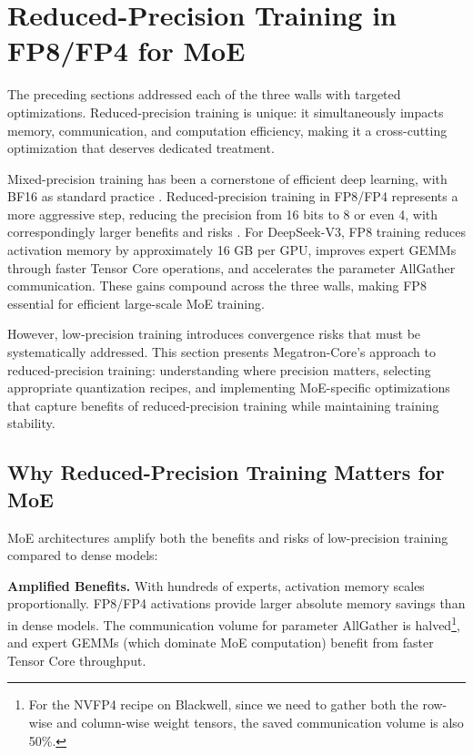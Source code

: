 
\section{Reduced-Precision Training in FP8/FP4 for MoE}\label{sec:reduced-precision-training}

The preceding sections addressed each of the three walls with targeted optimizations. Reduced-precision training is unique: it simultaneously impacts memory, communication, and computation efficiency, making it a cross-cutting optimization that deserves dedicated treatment.

Mixed-precision training has been a cornerstone of efficient deep learning, with BF16 as standard practice \cite{micikevicius2018mixed,peng2023fp8lmtrainingfp8large,xi2024coat}. Reduced-precision training in FP8/FP4 represents a more aggressive step, reducing the precision from 16 bits to 8 or even 4, with correspondingly larger benefits and risks \cite{micikevicius2022fp8formatsdeeplearning,fishman2025scalingfp8trainingtrilliontoken}. For DeepSeek-V3, FP8 training reduces activation memory by approximately 16 GB per GPU, improves expert GEMMs through faster Tensor Core operations, and accelerates the parameter AllGather communication. These gains compound across the three walls, making FP8 essential for efficient large-scale MoE training.

However, low-precision training introduces convergence risks that must be systematically addressed. This section presents Megatron-Core's approach to reduced-precision training: understanding where precision matters, selecting appropriate quantization recipes, and implementing MoE-specific optimizations that capture benefits of reduced-precision training while maintaining training stability.

\subsection{Why Reduced-Precision Training Matters for MoE}\label{sec:precision-anatomy}

MoE architectures amplify both the benefits and risks of low-precision training compared to dense models:

\textbf{Amplified Benefits.} With hundreds of experts, activation memory scales proportionally. FP8/FP4 activations provide larger absolute memory savings than in dense models. The communication volume for parameter AllGather is halved\footnote{For the NVFP4 recipe on Blackwell, since we need to gather both the row-wise and column-wise weight tensors, the saved communication volume is also 50\%.}, and expert GEMMs (which dominate MoE computation) benefit from faster Tensor Core throughput.

